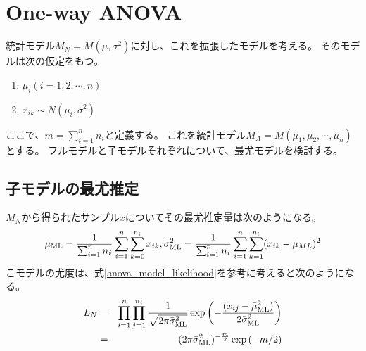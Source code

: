 \section{One-way ANOVA}
統計モデル$M_N= M (\mu,\sigma^2)$に対し、これを拡張したモデルを考える。
そのモデルは次の仮定をもつ。
\begin{enumerate}
    \item $\mu_i (i=1,2,\cdots,n)$
    \item $x_{ik} \sim N(\mu_i,\sigma^2)$
\end{enumerate}
ここで、$m=\sum_{i=1}^n n_i$と定義する。
これを統計モデル$M_A=M(\mu_1,\mu_2,\cdots,\mu_n)$とする。
フルモデルと子モデルそれぞれについて、最尤モデルを検討する。

\subsection{子モデルの最尤推定}
$M_N$から得られたサンプル$x$についてその最尤推定量は次のようになる。
\begin{equation*}
    \bar{\mu}_{\rm{ML}} = \frac{1}{\sum_{i=1}^n n_i} \sum_{i=1}^n\sum_{k=0}^{n_i} x_{ik}, \\
    \bar{\sigma}_{\rm{ML}}^2 =  \frac{1}{\sum_{i=1}^n n_i} \sum_{i=1}^n \sum_{k=1}^{n_i}(x_{ik} -\bar{\mu}_{ML})^2
\end{equation*}
こモデルの尤度は、式\ref{anova_model_likelihood}を参考に考えると次のようになる。
\begin{eqnarray*}
 L_N&=& \prod_{i=1}^n \prod_{j=1}^{n_i}\frac{1}{\sqrt{2\pi \bar{\sigma}^2_{\rm{ML}}}}\exp\left(  -\frac{(x_{ij}-\bar{\mu}_{\rm{ML}}^2)}{2 \bar{\sigma}^2_{\rm{ML}}}\right) \\
&=&  (2\pi \bar{\sigma}^2_{\rm{ML}})^{-\frac{m}{2} }\exp\left(  -m/2\right) 
\end{eqnarray*}

